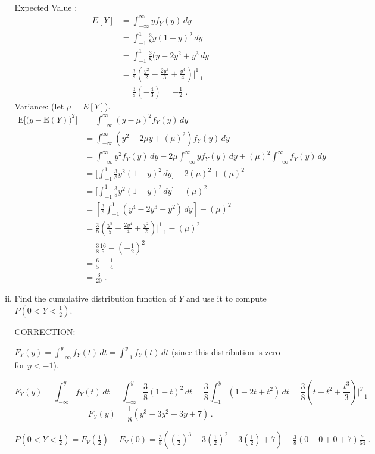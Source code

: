 \documentclass[letterpaper,12pt,fleqn]{article}
\begin{document}
\begin{enumerate}
\begin{enumerate}[(i)]
Expected Value :
\begin{align*}
E[Y] &= \int_{-\infty}^{\infty} yf_Y(y) \, dy \\ 
&=\int_{-1}^{1} \frac{3}{8} y (1-y)^2 \, dy  \\
&= \int_{-1}^{1} \frac{3}{8}(y-2y^2 + y^3 \, dy \\
&= \frac{3}{8} (\frac{y^2}{2} - \frac{2y^3}{3} + \frac{y^4}{4}) \Big|_{-1}^{1} \\
&= \frac{3}{8}(- \frac{4}{3}) = -\frac{1}{2} \;.
\end{align*}
Variance: (let $\mu = E[Y]$).
\begin{align*}
\mbox{E} \big[ \big( y - \mbox{E}(Y) \big)^{2} \big] &= \int_{-\infty}^{\infty} (y-\mu)^2f_Y(y) \, dy \\
& = \int_{-\infty}^{\infty} (y^2 - 2\mu y + (\mu)^2)f_Y(y)\, dy \\ & = \int_{-\infty}^{\infty} y^2 f_Y(y)\,dy -2\mu \int_{-\infty}^{\infty} y f_Y(y)\, dy + (\mu)^2\int_{-\infty}^{\infty} f_Y(y)\, dy \\
&= \big[\int_{-1}^{1} \frac{3}{8} y^2 (1-y)^2\, dy\big]- 2(\mu)^2 + (\mu)^2 \\
& =\big[\int_{-1}^{1} \frac{3}{8} y^2 (1-y)^2\, dy\big] - (\mu)^2\\ 
&=[\frac{3}{8} \int_{-1}^{1} (y^4 -2y^3 +y^2)\, dy] - (\mu)^2 \\
&= \frac{3}{8}(\frac{y^5}{5} -\frac{2y^4}{4} + \frac{y^2}{2})\Big|_{-1}^{1}- (\mu)^2 \\
&= \frac{3}{8} \frac{16}{5} - (-\frac{1}{2})^2 \\
&= \frac{6}{5} - \frac{1}{4} \\
&= \frac{3}{20} \;.
\end{align*}

\item Find the cumulative distribution function of $Y$ and use it to compute $P(0 < Y < \frac{1}{2})$.

CORRECTION:

$F_Y(y) = \int_{-\infty}^{y} f_Y(t) \, dt = \int_{-1}^{y} f_Y(t) \, dt$ (since this distribution is zero for $y<-1$).

$$F_Y(y) = \int_{-\infty}^{y} f_Y(t) \, dt = \int_{-\infty}^{y} \frac{3}{8} (1-t)^2 \, dt = \frac{3}{8} \int_{-1}^{y} (1-2t +t^2) \, dt  = \frac{3}{8} (t-t^2 + \frac{t^3}{3}) \Big|_{-1}^{y}$$
$$ F_Y(y) = \frac{1}{8} (y^3-3y^2+3y + 7) \,.$$

$P(0<Y<\frac{1}{2}) =F_Y(\frac{1}{2})-F_Y(0) = \frac{3}{8}((\frac{1}{2})^3 - 3(\frac{1}{2})^2 + 3(\frac{1}{2}) + 7) - \frac{3}{8}(0-0+0+7)\frac{7}{64} \;.$
\end{enumerate}



\end{enumerate}
\end{document}

